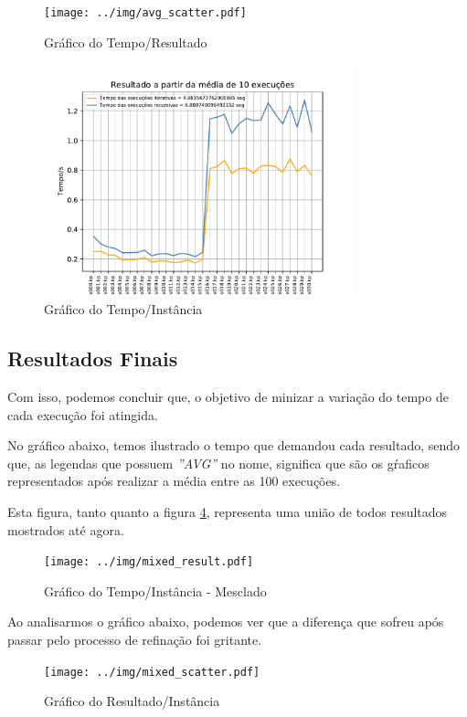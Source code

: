 \documentclass[a4paper, 12pt]{article}
\begin{document}
\begin{figure}[!htb]
    \centering
    \texttt{[image: ../img/avg\_scatter.pdf]}
    \caption{Gráfico do Tempo/Resultado}
    \label{fig:avg_scatter}
\end{figure}
\begin{figure}[!htb]
    \centering
    \includegraphics[width=0.8\textwidth]{../img/avg_result.pdf}
    \caption{Gráfico do Tempo/Instância}
    \label{fig:avg_result}
\end{figure}
\clearpage

\subsection{Resultados Finais}
Com isso, podemos concluir que, o objetivo de minizar a variação do tempo de cada execução foi atingida.

No gráfico abaixo, temos ilustrado o tempo que demandou cada resultado, sendo que, as legendas que possuem
{\it ''AVG''} no nome, significa que são os gŕaficos representados após realizar a média entre as 100 execuções.

Esta figura, tanto quanto a figura \ref{fig:mixed_scatter}, representa uma união de todos resultados mostrados até agora.

\begin{figure}[!htb]
    \centering
    \texttt{[image: ../img/mixed\_result.pdf]}
    \caption{Gráfico do Tempo/Instância - Mesclado}
    \label{fig:mixed_result}
\end{figure}
\newpage

Ao analisarmos o gráfico abaixo, podemos ver que a diferença que  sofreu após passar
pelo processo de refinação foi gritante.

\begin{figure}[!htb]
    \centering
    \texttt{[image: ../img/mixed\_scatter.pdf]}
    \caption{Gráfico do Resultado/Instância}
    \label{fig:mixed_scatter}
\end{figure}
\end{document}
